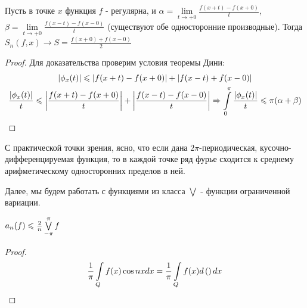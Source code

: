 \begin{corollary}
	Пусть в точке $x$ функция $f$ - регулярна, и 
	$\alpha = \lim\limits_{t\rightarrow +0}\frac{f(x + t) - f(x + 0)}{t}$,
	$\beta = \lim\limits_{t\rightarrow +0}\frac{f(x - t) - f(x - 0)}{t}$
	(существуют обе односторонние производные).
	Тогда $S_n(f, x) \rightarrow S = \frac{f(x + 0) + f(x - 0)}{2}$
\end{corollary}
	
\begin{proof}
	Для доказательства проверим условия теоремы Дини:
	\begin{gather*}
		\left|\phi_x(t)\right| \leqslant \left|f(x + t) - f(x + 0)\right| + \left|f(x - t) + f(x - 0)\right|\\
		\frac{\left|\phi_x(t)\right|}{t} \leqslant \left|\frac{f(x + t) - f(x + 0)}{t}\right| + 
		\left|\frac{f(x - t) - f(x - 0)}{t}\right|\Rightarrow
		\int\limits_{0}^{\pi} \frac{\left|\phi_x(t)\right|}{t} \leqslant \pi(\alpha + \beta)
	\end{gather*}
\end{proof}


С практической точки зрения, ясно, что если дана $2\pi$-периодическая, 
кусочно-дифференцируемая функция, то в каждой точке 
ряд фурье сходится к среднему арифметическому односторонних пределов в ней.

Далее, мы будем работать с функциями из класса $\bigvee$ - функции ограниченной вариации.
\begin{statement}
	$a_n(f) \leqslant \frac{2}{n}\bigvee\limits_{-\pi}^{\pi} f$
\end{statement}

\begin{proof}
	\begin{gather*}
		\frac{1}{\pi}\int\limits_{Q}f(x)\cos nx dx = 
		\frac{1}{\pi}\int\limits_{Q} f(x) d\left( \right)dx
	\end{gather*}
\end{proof}

